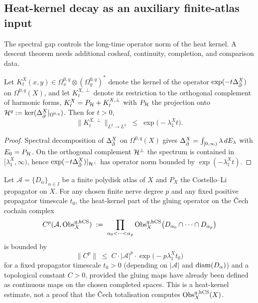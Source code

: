 \subsection{Heat-kernel decay as an auxiliary finite-atlas input}
\label{subsec:heat-kernel-cech}

The spectral gap controls the long-time operator norm of the heat
kernel. A descent theorem needs additional cosheaf, continuity,
completion, and comparison data.

\begin{proposition}
\label{prop:heat-kernel-decay}
\ClaimStatusProposition{}
Let $K_t^X(x,y) \in \Omega^{0,q}_x \otimes (\Omega^{0,q}_y)^*$ denote
the kernel of the operator $\exp(-t \Delta_{\bar\partial}^X)$ on
$\Omega^{0,q}(X)$, and let $K_t^{X,\perp}$ denote its restriction to
the orthogonal complement of harmonic forms,
$K_t^X = P_{\mathcal{H}} + K_t^{X,\perp}$ with $P_{\mathcal{H}}$ the projection onto
$\mathcal{H}^q := \ker(\Delta_{\bar\partial}^X|_{\Omega^{0,q}})$. Then for $t > 0$,
\begin{equation}
\label{eq:heat-kernel-perp-bound}
 \bigl\| K_t^{X,\perp} \bigr\|_{L^2 \to L^2}
 \;\leq\; \exp\bigl(-\lambda_1^X t\bigr).
\end{equation}
\end{proposition}

\begin{proof}
Spectral decomposition of $\Delta_{\bar\partial}^X$ on $\Omega^{0,q}(X)$ gives
$\Delta_{\bar\partial}^X = \int_{[0,\infty)} \lambda \, dE_\lambda$ with
$E_0 = P_{\mathcal{H}}$. On the orthogonal complement $\mathcal{H}^\perp$ the spectrum
is contained in $[\lambda_1^X, \infty)$, hence
$\exp(-t\Delta_{\bar\partial}^X)|_{\mathcal{H}^\perp}$ has operator norm bounded by
$\exp(-\lambda_1^X t)$.
\end{proof}

\begin{proposition}
\label{prop:cech-MV-convergence}
\ClaimStatusProposition{}
Let $\mathcal{A} = \{D_\alpha\}_{\alpha \in I}$ be a finite polydisk
atlas of $X$ and $P_X$ the Costello--Li propagator on $X$. For any
chosen finite nerve degree $p$ and any fixed positive propagator
timescale $t_0$, the heat-kernel part of the gluing operator on the
\v{C}ech cochain complex
\begin{equation}
\label{eq:cech-cochain}
 C^p(\mathcal{A}, \mathrm{Obs}^{q,\mathrm{hCS}}_X) \;:=\; \prod_{\alpha_0 < \cdots < \alpha_p} \mathrm{Obs}^{q,\mathrm{hCS}}_X\bigl(D_{\alpha_0} \cap \cdots \cap D_{\alpha_p}\bigr)
\end{equation}
is bounded by
\begin{equation}
\label{eq:cech-convergence-rate}
 \bigl\| C^p \bigr\| \;\leq\; C \cdot |\mathcal{A}|^p \cdot \exp\bigl(-p \lambda_1^X t_0\bigr)
\end{equation}
for a fixed propagator timescale $t_0 > 0$ \textup{(}depending on
$|\mathcal{A}|$ and $\mathrm{diam}(D_\alpha)$\textup{)} and a topological
constant $C > 0$, provided the gluing maps have already been defined
as continuous maps on the chosen completed spaces. This is a
heat-kernel estimate, not a proof that the \v{C}ech totalisation
computes $\mathrm{Obs}^{q,\mathrm{hCS}}_X(X)$.
\end{proposition}

